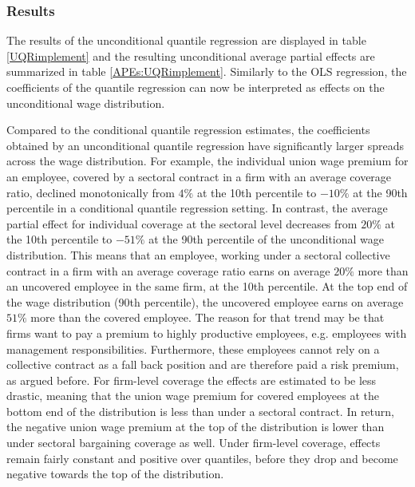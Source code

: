 \subsubsection*{Results}
The results of the unconditional quantile regression are displayed in table \ref{UQRimplement} and the resulting unconditional average partial effects are summarized in table \ref{APEs:UQRimplement}. Similarly to the OLS regression, the coefficients of the quantile regression can now be interpreted as effects on the unconditional wage distribution.

Compared to the conditional quantile regression estimates, the coefficients obtained by an unconditional quantile regression have significantly larger spreads across the wage distribution. For example, the individual union wage premium for an employee, covered by a sectoral contract in a firm with an average coverage ratio, declined monotonically from $4\%$ at the 10th percentile to $-10\%$ at the 90th percentile in a conditional quantile regression setting. In contrast, the average partial effect for individual coverage at the sectoral level decreases from $20\%$ at the 10th percentile to $-51\%$ at the 90th percentile of the unconditional wage distribution. This means that an employee, working under a sectoral collective contract in a firm with an average coverage ratio earns on average $20\%$ more than an uncovered employee in the same firm, at the 10th percentile. At the top end of the wage distribution (90th percentile), the uncovered employee earns on average $51\%$ more than the covered employee. The reason for that trend may be that firms want to pay a premium to highly productive employees, e.g. employees with management responsibilities. Furthermore, these employees cannot rely on a collective contract as a fall back position and are therefore paid a risk premium, as argued before. For firm-level coverage the effects are estimated to be less drastic, meaning that the union wage premium for covered employees at the bottom end of the distribution is less than under a sectoral contract. In return, the negative union wage premium at the top of the distribution is lower than under sectoral bargaining coverage as well. Under firm-level coverage, effects remain fairly constant and positive over quantiles, before they drop and become negative towards the top of the distribution.
